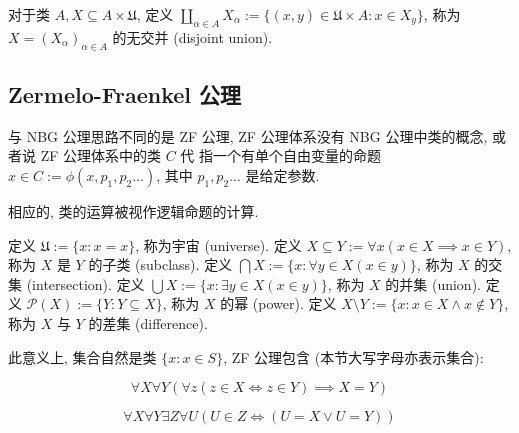 \begin{definition}[无交并]
    \label {definition:disjoint union}
    对于类 \(A,X \subseteq A \times \mathfrak{U}\), 定义 \(\coprod_{\alpha \in A} X_\alpha := \{(x,y) \in \mathfrak{U} \times A : x \in X_y\}\), 称为 \(X = (X_\alpha)_{\alpha \in A}\) 的无交并 (disjoint union).
\end{definition}

\subsection{Zermelo-Fraenkel 公理}

与 NBG 公理思路不同的是 ZF 公理, ZF 公理体系没有 NBG 公理中类的概念, 或者说 ZF 公理体系中的类 \(C\) 代
指一个有单个自由变量的命题 \(x \in C := \phi(x, p_1, p_2 \dots)\), 其中 \(p_1, p_2 \dots\) 是给定参数.

相应的, 类的运算被视作逻辑命题的计算.

\begin{definition}
    \label {definition:ZF universe}
    定义 \(\mathfrak{U} := \{x : x = x\}\), 称为宇宙 (universe).
    \label {definition:ZF subclass}
    定义 \(X \subseteq Y := \forall x (x \in X \implies x \in Y)\), 称为 \(X\) 是 \(Y\) 的子类 (subclass).
    \label {definition:ZF class intersection}
    定义 \(\bigcap X := \{x : \forall y \in X (x \in y)\}\), 称为 \(X\) 的交集 (intersection).
    \label {definition:ZF class union}
    定义 \(\bigcup X := \{x : \exists y \in X (x \in y)\}\), 称为 \(X\) 的并集 (union).
    \label {definition:ZF power class}
    定义 \(\mathcal{P} (X) := \{Y : Y \subseteq X\}\), 称为 \(X\) 的幂 (power).
    \label {definition:ZF class difference}
    定义 \(X \setminus Y := \{x : x \in X \land x \notin Y\}\), 称为 \(X\) 与 \(Y\) 的差集 (difference).
\end{definition}

此意义上, 集合自然是类 \(\{x:x \in S\}\), ZF 公理包含 (本节大写字母亦表示集合):

\begin{axiom}
    \label {axiom:ZF Axiom of Extensionality}
    \[
        \forall X \forall Y (\forall z (z \in X \iff z \in Y) \implies X = Y)
    \]
\end{axiom}

\begin{axiom}
    \label {axiom:ZF Axiom of Pair}
    \[
        \forall X \forall Y \exists Z \forall U (U \in Z \iff (U = X \lor U = Y))
    \]
\end{axiom}


